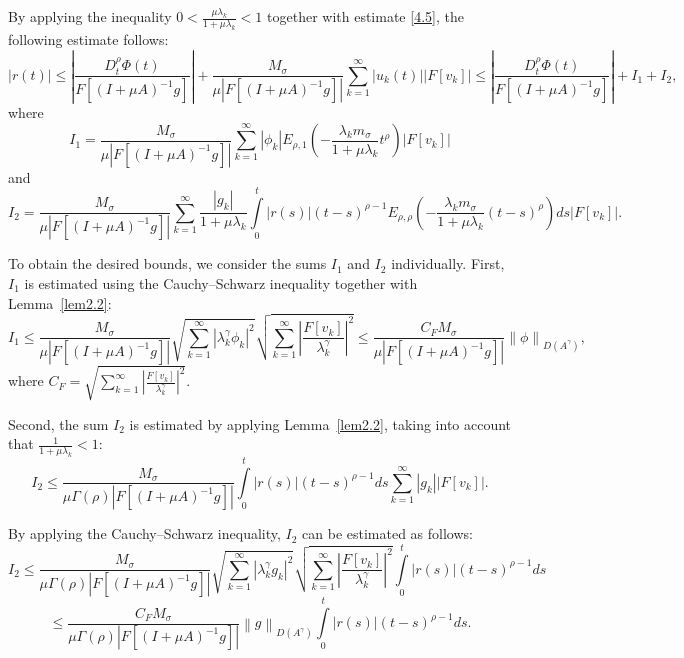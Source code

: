 \documentclass[reqno]{amsart}
\theoremstyle{definition}
\numberwithin{equation}{section}
\begin{document}
By applying the inequality $0<\frac{\mu {{\lambda }_{k}}}{1+\mu {{\lambda }_{k}}}<1$ together with estimate \eqref{4.5}, the following estimate follows:
$$
\left| r(t) \right| \leq \left| \frac{D_{t}^{\rho }\Phi (t)}{F[{{(I+\mu A)}^{-1}}g]} \right|+\frac{{{M}_{\sigma }}}{\mu \left| F[{{(I+\mu A)}^{-1}}g] \right|}\sum\limits_{k=1}^{\infty }{\left| {{u}_{k}}(t) \right|\left| F\left[ {{v}_{k}} \right] \right|}\le\left| \frac{D_{t}^{\rho }\Phi (t)}{F[{{(I+\mu A)}^{-1}}g]} \right|+I_1+I_2,
$$
where
$$
I_1=\frac{{{M}_{\sigma }}}{\mu \left| F[{{(I+\mu A)}^{-1}}g] \right|}\sum\limits_{k=1}^{\infty }{\left| {{\phi }_{k}} \right|{{E}_{\rho ,1}}\left( -\frac{{{\lambda }_{k}}{{m}_{\sigma }}}{1+\mu {{\lambda }_{k}}}{{t}^{\rho }} \right)\left| F\left[ {{v}_{k}} \right] \right|}
$$
and
$$
{{I}_{2}}=\frac{{{M}_{\sigma }}}{\mu \left| F[{{(I+\mu A)}^{-1}}g] \right|}\sum\limits_{k=1}^{\infty }{\frac{\left| {{g}_{k}} \right|}{1+\mu {{\lambda }_{k}}}\int\limits_{0}^{t}{\left| r(s) \right|{{(t-s)}^{\rho -1}}{{E}_{\rho ,\rho }}\left( -\frac{{{\lambda }_{k}}{{m}_{\sigma }}}{1+\mu {{\lambda }_{k}}}{{(t-s)}^{\rho }} \right)ds}}\left| F\left[ {{v}_{k}} \right] \right|.
$$

To obtain the desired bounds, we consider the sums $I_1$ and $I_2$ individually. First, $I_1$ is estimated using the Cauchy–Schwarz inequality together with Lemma~\ref{lem2.2}:
\begin{equation}\label{5.8}
{{I}_{1}}\le \frac{{{M}_{\sigma }}}{\mu \left| F[{{(I+\mu A)}^{-1}}g] \right|}\sqrt{\sum\limits_{k=1}^{\infty }{{{\left| \lambda _{k}^{\gamma  }{{\phi }_{k}} \right|}^{2}}}}\sqrt{\sum\limits_{k=1}^{\infty }{{{\left| \frac{F\left[ {{v}_{k}} \right]}{\lambda _{k}^{\gamma  }} \right|}^{2}}}}\le \frac{{{C}_{F}}{{M}_{\sigma }}}{\mu \left| F[{{(I+\mu A)}^{-1}}g] \right|}{{\left\| \phi  \right\|}_{D({{A}^{\gamma  }})}},
\end{equation}
where ${{C}_{F}}=\sqrt{\sum\limits_{k=1}^{\infty }{{{\left| \frac{F\left[ {{v}_{k}} \right]}{\lambda _{k}^{\gamma  }} \right|}^{2}}}}$.

Second, the sum $I_2$ is estimated by applying Lemma~\ref{lem2.2}, taking into account that $\frac{1}{1+\mu \lambda_k}<1$:
$$
{{I}_{2}}\le \frac{{{M}_{\sigma }}}{\mu \Gamma (\rho )\left| F[{{(I+\mu A)}^{-1}}g] \right|}\int\limits_{0}^{t}{|r(s)|{{(t-s)}^{\rho -1}}ds}\sum\limits_{k=1}^{\infty }{\left| {{g}_{k}} \right|\left| F\left[ {{v}_{k}} \right] \right|}.
$$

By applying the Cauchy–Schwarz inequality, $I_2$ can be estimated as follows:
$$
{{I}_{2}}\le \frac{{{M}_{\sigma }}}{\mu \Gamma (\rho )\left| F[{{(I+\mu A)}^{-1}}g] \right|}\sqrt{\sum\limits_{k=1}^{\infty }{{{\left| \lambda _{k}^{\gamma  }{{g}_{k}} \right|}^{2}}}}\sqrt{\sum\limits_{k=1}^{\infty }{{{\left| \frac{F\left[ {{v}_{k}} \right]}{\lambda _{k}^{\gamma  }} \right|}^{2}}}}\int\limits_{0}^{t}{|r(s)|{{(t-s)}^{\rho -1}}ds}
$$
\begin{equation}\label{5.9}
\le \frac{{{C}_{F}}{{M}_{\sigma }}}{\mu \Gamma (\rho )\left| F[{{(I+\mu A)}^{-1}}g] \right|}{{\left\| g \right\|}_{D(A^{\gamma })}}\int\limits_{0}^{t}{|r(s)|{{(t-s)}^{\rho -1}}ds}.
\end{equation}
\end{document}
